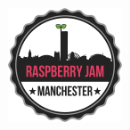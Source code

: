 \title{
	\begin{center}
		\includegraphics[width=30mm]{McrRaspJam/Common/logo-512}
	\end{center}
	\vspace{12pt}
	\workshopTitle
	}
	
\author{
	}

\date{}

\maketitle
	
\setcounter{tocdepth}{1}
\tableofcontents